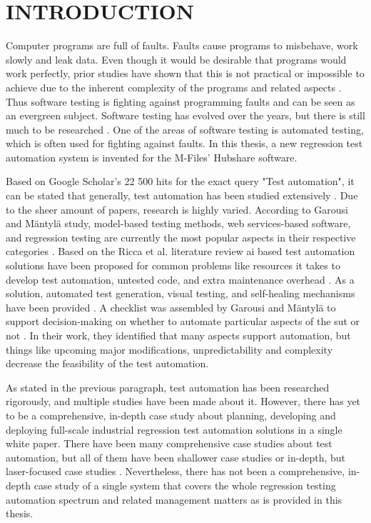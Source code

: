 \chapter{INTRODUCTION}\label{chapter:introduction}

Computer programs are full of faults. Faults cause programs to misbehave, work slowly and leak data. Even though it would be desirable that programs would work perfectly, prior studies have shown that this is not practical or impossible to achieve due to the inherent complexity of the programs and related aspects \cite{simmonds2018complexity,weinberg2008perfect,glenford2012art}. Thus software testing is fighting against programming faults and can be seen as an evergreen subject. Software testing has evolved over the years, but there is still much to be researched \cite{glenford2012art}. One of the areas of software testing is automated testing, which is often used for fighting against faults. In this thesis, a new regression test automation system is invented for the M-Files' Hubshare software.

Based on Google Scholar's 22 500 hits for the exact query "Test automation", it can be stated that generally, test automation has been studied extensively \cite{googleScholar}. Due to the sheer amount of papers, research is highly varied. According to Garousi and Mäntylä study, model-based testing methods, web services-based software, and regression testing are currently the most popular aspects in their respective categories \cite{garousi2016software}. Based on the Ricca et al. literature review \gls{ai} based test automation solutions have been proposed for common problems like resources it takes to develop test automation, untested code, and extra maintenance overhead \cite{aiRicca2021}. As a solution, automated test generation, visual testing, and self-healing mechanisms have been provided \cite{aiRicca2021}. A checklist was assembled by Garousi and Mäntylä to support decision-making on whether to automate particular aspects of the \gls{sut} or not \cite{garousi2016when}. In their work, they identified that many aspects support automation, but things like upcoming major modifications, unpredictability and complexity decrease the feasibility of the test automation.

As stated in the previous paragraph, test automation has been researched rigorously, and multiple studies have been made about it. However, there has yet to be a comprehensive, in-depth case study about planning, developing and deploying full-scale industrial regression test automation solutions in a single white paper. There have been many comprehensive case studies about test automation, but all of them have been shallower case studies \cite{graham2012experiences} or in-depth, but laser-focused case studies \cite{garousi2018introducing,ramler2018adapting,lee2018architecture}. Nevertheless, there has not been a comprehensive, in-depth case study of a single system that covers the whole regression testing automation spectrum and related management matters as is provided in this thesis.

